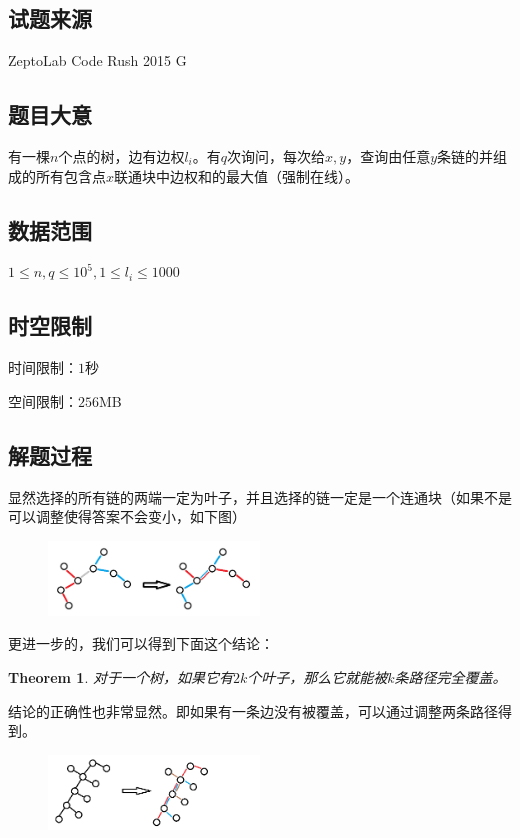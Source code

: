 \documentclass[12pt]{article}
\newtheorem{theorem}{Theorem}
\begin{document}
\subsection{试题来源}
ZeptoLab Code Rush 2015  G
\subsection{题目大意}
有一棵$n$个点的树，边有边权$l_i$。有$q$次询问，每次给$x,y$，查询由任意$y$条链的并组成的所有包含点$x$联通块中边权和的最大值（强制在线）。

\subsection{数据范围}
$1\le n, q\le 10^5, 1\le l_i \le 1000$
\subsection{时空限制}
时间限制：$1$秒

空间限制：$256$MB
\subsection{解题过程}
显然选择的所有链的两端一定为叶子，并且选择的链一定是一个连通块（如果不是可以调整使得答案不会变小，如下图）
\begin{figure}[h] %
    \centering %
    \includegraphics[width=0.5\textwidth]{p1.png} %
    \label{p1} %
\end{figure}%

更进一步的，我们可以得到下面这个结论：

\begin{theorem}
  对于一个树，如果它有$2k$个叶子，那么它就能被$k$条路径完全覆盖。
\end{theorem}

结论的正确性也非常显然。即如果有一条边没有被覆盖，可以通过调整两条路径得到。
\begin{figure}[h]
  \centering
  \includegraphics[width=0.5\textwidth]{p2.png}
  \label{p2}
\end{figure}
\end{document}
